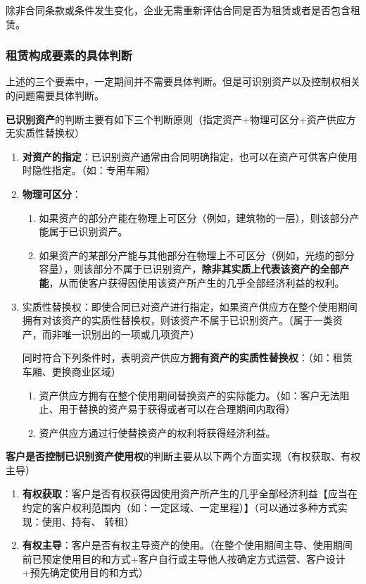 \documentclass[UTF8,12pt]{ctexart}
\numberwithin{equation}{section} %
\numberwithin{figure}{section}
\numberwithin{table}{section}
\begin{document}
	除非合同条款或条件发生变化，企业无需重新评估合同是否为租赁或者是否包含租赁。

	\subsubsection{租赁构成要素的具体判断}
	上述的三个要素中，一定期间并不需要具体判断。但是可识别资产以及控制权相关的问题需要具体判断。
	
	\textbf{已识别资产}的判断主要有如下三个判断原则（指定资产+物理可区分+资产供应方无实质性替换权）
	\begin{enumerate}
		
		\item \textbf{对资产的指定}：已识别资产通常由合同明确指定，也可以在资产可供客户使用时隐性指定。（如：专用车厢）
		
		\item \textbf{物理可区分}：
		\begin{enumerate}
			\item 如果资产的部分产能在物理上可区分（例如，建筑物的一层），则该部分产能属于已识别资产。
			
			\item 如果资产的某部分产能与其他部分在物理上不可区分（例如，光缆的部分容量），则该部分不属于已识别资产，\textbf{除非其实质上代表该资产的全部产能}，从而使客户获得因使用该资产所产生的几乎全部经济利益的权利。
		\end{enumerate}
		
		\item 实质性替换权：即使合同已对资产进行指定，如果资产供应方在整个使用期间拥有对该资产的实质性替换权，则该资产不属于已识别资产。（属于一类资产，而非唯一识别出的一项或几项资产）
			
		同时符合下列条件时，表明资产供应方\textbf{拥有资产的实质性替换权}：（如：租赁车厢、更换商业区域）
		\begin{enumerate}
			\item 资产供应方拥有在整个使用期间替换资产的实际能力。（如：客户无法阻止、用于替换的资产易于获得或者可以在合理期间内取得）
			
			\item 资产供应方通过行使替换资产的权利将获得经济利益。
		\end{enumerate}
		
	\end{enumerate}
	
	\textbf{客户是否控制已识别资产使用权}的判断主要从以下两个方面实现（有权获取、有权主导）
	\begin{enumerate}
		\item \textbf{有权获取}：客户是否有权获得因使用资产所产生的几乎全部经济利益【应当在约定的客户权利范围内（如：一定区域、一定里程）】（可以通过多种方式实现：使用、持有、
		转租）
		
		\item \textbf{有权主导}：客户是否有权主导资产的使用。（在整个使用期间主导、使用期间前已预定使用目的和方式+客户自行或主导他人按确定方式运营、客户设计+预先确定使用目的和方式）
	\end{enumerate}
\end{document}
